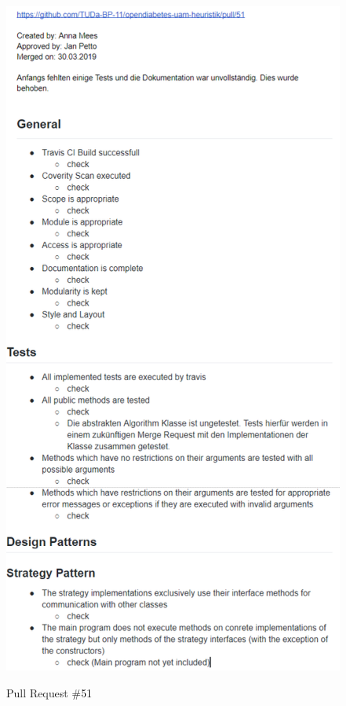 \documentclass[accentcolor=tud0b,12pt,paper=a4]{tudreport}
\begin{document}
\begin{figure}[h]
\centering
\caption{Pull Request \#51}
\includegraphics[width=\textwidth,height=\textheight,keepaspectratio]{pr-51}
\label{pr:51}
\end{figure}
\end{document}
